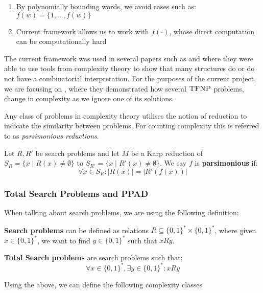 \begin{enumerate}
    \item By polynomially bounding words, we avoid cases such as: $f(w) = \{1, \hdots, f(w)\}$
    \item Current framework allows us to work with $f(\cdot)$, whose direct computation can be computationally hard
\end{enumerate}


The current framework was used in several papers such as
\cite{ikenmeyerWhatWhatNot2022} and \cite{ikenmeyerPositivitySymmetricGroup2024}
where they were able to use tools from complexity theory to show that
many structures do or do not have a combinatorial interpretation.
For the purposes of the current project, we are focusing on \cite{ikenmeyerWhatWhatNot2022},
where they demonstrated how several $\textsc{TFNP}$ problems, 
change in complexity as we ignore one of its solutions.


Any class of problems in complexity theory utilises the notion of reduction
to indicate the similarity between problems. For counting complexity
this is referred to as \textit{parsimonious reductions}.


\begin{definition}
    Let $R, R'$ be search problems and let $M$ be a Karp reduction of
    $S_R = \{x \mid R(x) \neq \emptyset \}$ to $S_{R'} = \{x \mid R'(x) \neq \emptyset \}$.
    We say $f$ is \textbf{parsimonious} if:
    $$
    \forall x \in S_R : |R(x)| = |R'(f(x))|
    $$ 
\end{definition}

\subsubsection{Total Search Problems and PPAD}
When talking about search problems, we are using the following definition:

\begin{definition}
    \textbf{Search problems} can be defined as relations $R \subseteq \{0,1\}^* \times \{0,1\}^*$,
    where given $x \in \{0,1\}^*$, we want to find $y \in \{0,1\}^*$  such that $x Ry$.

    \textbf{Total Search problems} are search problems such that:
    $$
    \forall x \in \{0,1\}^*, \exists y \in \{0,1\}^* : xRy
    $$
\end{definition}

Using the above, we can define the following complexity classes

